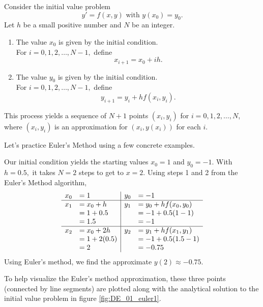 {Consider the initial value problem
\[
y' = f(x,y) \text{ with } y(x_0)=y_0.
\]
Let $h$ be a small positive number and $N$ be an integer.
\begin{enumerate}
\item The value $x_0$ is given by the initial condition.\\
For $i = 0, 1, 2, \ldots, N-1,$ define
\[x_{i+1} = x_0 + ih.\]
\item  The value $y_0$ is given by the initial condition.\\
For $i = 0, 1, 2, \ldots, N-1,$ define
\[y_{i+1} = y_i + hf(x_i,y_i).\]
\end{enumerate}
This process yields a sequence of $N+1$ points $(x_i,y_i)$ for $i= 0,1,2,\ldots,N$, where $(x_i, y_i)$ is an approximation for $(x_i,y(x_i))$ for each $i$.
}
Let's practice Euler's Method using a few concrete examples.\\

{Our initial condition yields the starting values $x_0 = 1$ and $y_0 = -1$.  With $h = 0.5,$ it takes $N=2$ steps to get to $x=2.$  Using steps 1 and 2 from the Euler's Method algorithm,
\[
\begin{array}{rl | rl}
x_0  &= 1			& 	y_0	&= -1\\ \hline
x_1 	&= x_0 + h 	& 	y_1 	&= y_0 + hf(x_0,y_0)\\
	&= 1 + 0.5	 	&		&= -1 + 0.5(1 - 1)\\
	&= 1.5		&		&= -1\\ \hline
x_2	&= x_0 + 2h	&	y_2	&= y_1 + hf(x_1,y_1)\\
	&= 1 + 2(0.5)	&		&= -1 + 0.5(1.5 -1)\\
	&= 2			&		&= -0.75
\end{array}
\]
Using Euler's method, we find the approximate $y(2) \approx -0.75.$

To help visualize the Euler's method approximation, these three points (connected by line segments) are plotted along with the analytical solution to the initial value problem in figure \ref{fig:DE_01_euler1}.
}\\


